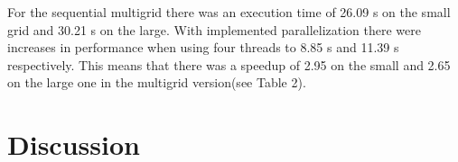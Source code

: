 \documentclass{article}
\begin{document}
For the sequential multigrid there was an execution time of 26.09 s on the small grid and 30.21 s on the large. With implemented parallelization there were increases in performance when using four threads to 8.85 s and 11.39 s respectively. This means that there was a speedup of 2.95 on the small and 2.65 on the large one in the multigrid version(see Table 2).

\begin{table}
\centering
{}
\caption{Sequential Multigrid test results}
\label{fig:multigrid}
\end{table}



\section{Discussion}\label{discussion}
\end{document}
